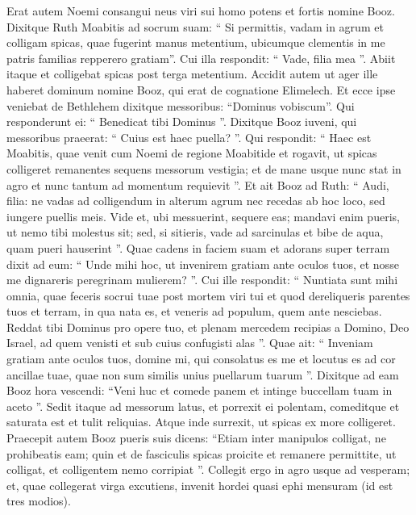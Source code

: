 \begin{biblechapter}
\begin{biblechapter}
\verse Erat autem Noemi consangui neus viri sui homo potens et fortis nomine Booz. 
\verse Dixitque Ruth Moabitis ad socrum suam: “ Si permittis, vadam in agrum et colligam spicas, quae fugerint manus metentium, ubicumque clementis in me patris familias repperero gratiam”. Cui illa respondit: “ Vade, filia mea ”.
 \verse Abiit itaque et colligebat spicas post terga metentium. Accidit autem ut ager ille haberet dominum nomine Booz, qui erat de cognatione Elimelech. 
\verse Et ecce ipse veniebat de Bethlehem dixitque messoribus: “Dominus vobiscum”. Qui responderunt ei: “ Benedicat tibi Dominus ”. 
\verse Dixitque Booz iuveni, qui messoribus praeerat: “ Cuius est haec puella? ”. 
\verse Qui respondit: “ Haec est Moabitis, quae venit cum Noemi de regione Moabitide 
\verse et rogavit, ut spicas colligeret remanentes sequens messorum vestigia; et de mane usque nunc stat in agro et nunc tantum ad momentum requievit ”.
 \verse Et ait Booz ad Ruth: “ Audi, filia: ne vadas ad colligendum in alterum agrum nec recedas ab hoc loco, sed iungere puellis meis. 
\verse Vide et, ubi messuerint, sequere eas; mandavi enim pueris, ut nemo tibi molestus sit; sed, si sitieris, vade ad sarcinulas et bibe de aqua, quam pueri hauserint ”. 
\verse Quae cadens in faciem suam et adorans super terram dixit ad eum: “ Unde mihi hoc, ut invenirem gratiam ante oculos tuos, et nosse me dignareris peregrinam mulierem? ”. 
\verse Cui ille respondit: “ Nuntiata sunt mihi omnia, quae feceris socrui tuae post mortem viri tui et quod dereliqueris parentes tuos et terram, in qua nata es, et veneris ad populum, quem ante nesciebas. 
\verse Reddat tibi Dominus pro opere tuo, et plenam mercedem recipias a Domino, Deo Israel, ad quem venisti et sub cuius confugisti alas ”. 
\verse Quae ait: “ Inveniam gratiam ante oculos tuos, domine mi, qui consolatus es me et locutus es ad cor ancillae tuae, quae non sum similis unius puellarum tuarum ”.
 \verse Dixitque ad eam Booz hora vescendi: “Veni huc et comede panem et intinge buccellam tuam in aceto ”. Sedit itaque ad messorum latus, et porrexit ei polentam, comeditque et saturata est et tulit reliquias. 
\verse Atque inde surrexit, ut spicas ex more colligeret. Praecepit autem Booz pueris suis dicens: “Etiam inter manipulos colligat, ne prohibeatis eam; 
\verse quin et de fasciculis spicas proicite et remanere permittite, ut colligat, et colligentem nemo corripiat ”.
 \verse Collegit ergo in agro usque ad vesperam; et, quae collegerat virga excutiens, invenit hordei quasi ephi mensuram (id est tres modios). 

\end{biblechapter}
\end{biblechapter}
